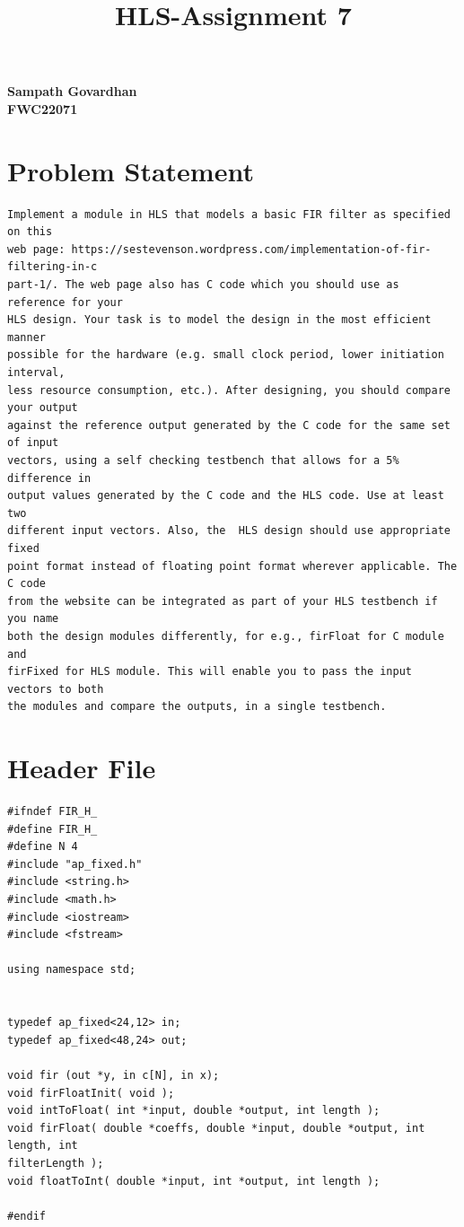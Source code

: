 \documentclass{article}
\title{
HLS-Assignment 7
}
\begin{document}
\maketitle
\hfill \textbf{Sampath Govardhan} \\
\null \hfill \textbf{FWC22071}\\

\section{Problem Statement}
\begin{lstlisting}
Implement a module in HLS that models a basic FIR filter as specified on this 
web page: https://sestevenson.wordpress.com/implementation-of-fir-filtering-in-c
part-1/. The web page also has C code which you should use as reference for your
HLS design. Your task is to model the design in the most efficient manner 
possible for the hardware (e.g. small clock period, lower initiation interval, 
less resource consumption, etc.). After designing, you should compare your output
against the reference output generated by the C code for the same set of input
vectors, using a self checking testbench that allows for a 5% difference in 
output values generated by the C code and the HLS code. Use at least two 
different input vectors. Also, the  HLS design should use appropriate fixed 
point format instead of floating point format wherever applicable. The C code 
from the website can be integrated as part of your HLS testbench if you name 
both the design modules differently, for e.g., firFloat for C module and 
firFixed for HLS module. This will enable you to pass the input vectors to both 
the modules and compare the outputs, in a single testbench.
\end{lstlisting}
\vspace{3cm}
\section{Header File}
\begin{lstlisting}
#ifndef FIR_H_
#define FIR_H_
#define N 4
#include "ap_fixed.h"
#include <string.h>
#include <math.h>
#include <iostream>
#include <fstream>

using namespace std;


typedef ap_fixed<24,12> in;
typedef ap_fixed<48,24> out;

void fir (out *y, in c[N], in x);
void firFloatInit( void );
void intToFloat( int *input, double *output, int length );
void firFloat( double *coeffs, double *input, double *output, int length, int
filterLength );
void floatToInt( double *input, int *output, int length );

#endif

\end{lstlisting}
\vspace{5cm}
\end{document}
